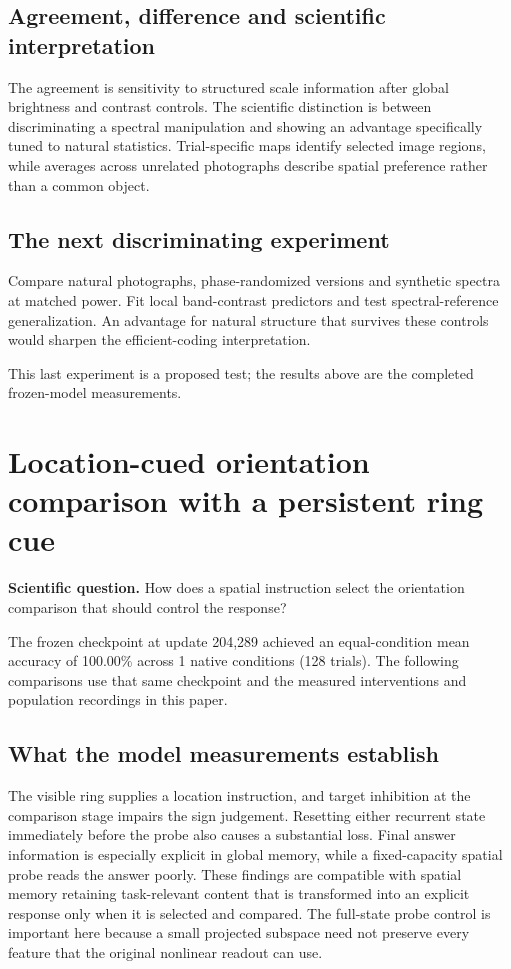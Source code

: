 \documentclass[11pt]{article}
\begin{document}
\subsection{Agreement, difference and scientific interpretation}
The agreement is sensitivity to structured scale information after global brightness and contrast controls. The scientific distinction is between discriminating a spectral manipulation and showing an advantage specifically tuned to natural statistics. Trial-specific maps identify selected image regions, while averages across unrelated photographs describe spatial preference rather than a common object.

\subsection{The next discriminating experiment}
Compare natural photographs, phase-randomized versions and synthetic spectra at matched power. Fit local band-contrast predictors and test spectral-reference generalization. An advantage for natural structure that survives these controls would sharpen the efficient-coding interpretation.

This last experiment is a proposed test; the results above are the completed frozen-model measurements.
\clearpage\section{Location-cued orientation comparison with a persistent ring cue}
\textbf{Scientific question.} How does a spatial instruction select the orientation comparison that should control the response?

The frozen checkpoint at update 204,289 achieved an equal-condition mean accuracy of 100.00\% across 1 native conditions (128 trials). The following comparisons use that same checkpoint and the measured interventions and population recordings in this paper.

\subsection{What the model measurements establish}
The visible ring supplies a location instruction, and target inhibition at the comparison stage impairs the sign judgement. Resetting either recurrent state immediately before the probe also causes a substantial loss. Final answer information is especially explicit in global memory, while a fixed-capacity spatial probe reads the answer poorly. These findings are compatible with spatial memory retaining task-relevant content that is transformed into an explicit response only when it is selected and compared. The full-state probe control is important here because a small projected subspace need not preserve every feature that the original nonlinear readout can use.
\end{document}
